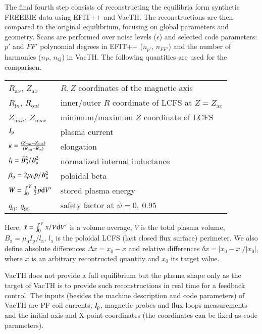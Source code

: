The final fourth step consists of reconstructing the equilibria form synthetic FREEBIE data using EFIT++ and VacTH. The reconstructions are then compared to the original equilibrium, focusing on global parameters and geometry. Scans are performed over noise levels ($\epsilon$) and selected code parameters: $p'$ and $FF'$ polynomial degrees in EFIT++ ($n_{p'}$, $n_{FF'}$) and the number of harmonics ($n_P$, $n_Q$) in VacTH. The following quantities are used for the comparison.
\begin{table}[!h]
    \begin{tabular}{ll}
    $R_{\mathrm ax}$, $Z_{\mathrm ax}$ & $R,Z$ coordinates of the magnetic axis \\
    $R_{\mathrm in}$, $R_{\mathrm out}$ & inner/outer $R$ coordinate of LCFS at $Z=Z_{\mathrm ax}$ \\
    $Z_{\mathrm min}$, $Z_{\mathrm max}$ & minimum/maximum $Z$ coordinate of LCFS \\
    $I_{\rm{p}}$ & plasma current \\
    $\kappa  = \frac{\left( {{Z_{{\rm{max}}}} - {Z_{{\rm{min}}}}} \right) } { \left( {{R_{{\rm{out}}}} - {R_{{\rm{in}}}}} \right) }$          & elongation   \\
    ${l_{\rm{i}}} = {{\bar B_{\rm{p}}^2}} / {{B_{\rm{a}}^2}}$          & normalized internal inductance   \\
    ${\beta _{\rm{p}}} = {{2{\mu _0}\bar p}} / {{B_{\rm{a}}^2}}$          & poloidal beta   \\
    $ W = \int_0^V {\frac{3}{2}p{\rm{d}}V'}$ & stored plasma energy \\
    $ q_0$, $q_{95}$ & safety factor at $\bar \psi = 0,\ 0.95$ \\
    \end{tabular}
\end{table}

Here, $\bar x = \int_0^V {x/V{\rm{d}}V'} $ is a volume average, $V$ is the total plasma volume, $B_{\mathrm a} = \mu _0 I_\mathrm{p} / l_{\mathrm a}$, $l_{\mathrm a}$ is the poloidal LCFS (last closed flux surface) perimeter.
We also define absolute differences $\Delta x = {{x_0} - x} $ and relative differences $\delta x = \left| {{x_0} - x} \right|/\left| {{x_0}} \right|$, where $x$ is an arbitrary recontructed quantity and $x_0$ its target value.

VacTH does not provide a full equilibrium but the plasma shape only as the target of VacTH is to provide such reconstructions in real time for a feedback control. The inputs (besides the machine description and code parameters) of VacTH are PF coil currents, $I_{\rm{p}}$, magnetic probes and flux loops measurements and the initial axis and X-point coordinates (the coordinates can be fixed as code parameters).

